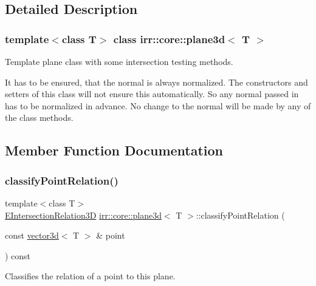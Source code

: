 \subsection{Detailed Description}
\subsubsection*{template$<$class T$>$\newline
class irr\+::core\+::plane3d$<$ T $>$}

Template plane class with some intersection testing methods. 

It has to be ensured, that the normal is always normalized. The constructors and setters of this class will not ensure this automatically. So any normal passed in has to be normalized in advance. No change to the normal will be made by any of the class methods. 

\subsection{Member Function Documentation}
\mbox{\label{classirr_1_1core_1_1plane3d_a14ba310b0ed9d14ce575f1c783cbd9a5}} 
\subsubsection{\texorpdfstring{classify\+Point\+Relation()}{classifyPointRelation()}}
{\footnotesize\ttfamily template$<$class T$>$ \\
\hyperlink{namespaceirr_1_1core_a8a9999eb0d151083f48afe5f7d17a96c}{E\+Intersection\+Relation3D} \hyperlink{classirr_1_1core_1_1plane3d}{irr\+::core\+::plane3d}$<$ T $>$\+::classify\+Point\+Relation (\begin{DoxyParamCaption}\item[{const \hyperlink{classirr_1_1core_1_1vector3d}{vector3d}$<$ T $>$ \&}]{point }\end{DoxyParamCaption}) const\hspace{0.3cm}{\ttfamily [inline]}}



Classifies the relation of a point to this plane. 


